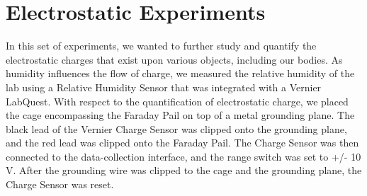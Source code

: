 \documentclass[12pt]{amsart}
\begin{document}
\section{Electrostatic Experiments}
\indent In this set of experiments, we wanted to further study and quantify the electrostatic charges that exist upon various objects, including our bodies. As humidity influences the flow of charge, we measured the relative humidity of the lab using a Relative Humidity Sensor that was integrated with a Vernier LabQuest. With respect to the quantification of electrostatic charge, we placed the cage encompassing the Faraday Pail on top of a metal grounding plane. The black lead of the Vernier Charge Sensor was clipped onto the grounding plane, and the red lead was clipped onto the Faraday Pail. The Charge Sensor was then connected to the data-collection interface, and the range switch was set to +/- 10 V. After the grounding wire was clipped to the cage and the grounding plane, the Charge Sensor was reset. 
\newpage




\printbibliography

	
\end{document}
